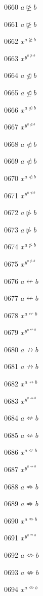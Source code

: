 \documentclass{article}
\begin{document}
0660 $a\ntrianglerighteq b$\par
0661 $\displaystyle a\ntrianglerighteq b$\par
0662 $x^{a\ntrianglerighteq b}$\par
0663 $x^{y^{a\ntrianglerighteq b}}$\par
0664 $a\ntrianglelefteq b$\par
0665 $\displaystyle a\ntrianglelefteq b$\par
0666 $x^{a\ntrianglelefteq b}$\par
0667 $x^{y^{a\ntrianglelefteq b}}$\par
0668 $a\ntriangleleft b$\par
0669 $\displaystyle a\ntriangleleft b$\par
0670 $x^{a\ntriangleleft b}$\par
0671 $x^{y^{a\ntriangleleft b}}$\par
0672 $a\ntriangleright b$\par
0673 $\displaystyle a\ntriangleright b$\par
0674 $x^{a\ntriangleright b}$\par
0675 $x^{y^{a\ntriangleright b}}$\par
0676 $a\nleftarrow b$\par
0677 $\displaystyle a\nleftarrow b$\par
0678 $x^{a\nleftarrow b}$\par
0679 $x^{y^{a\nleftarrow b}}$\par
0680 $a\nrightarrow b$\par
0681 $\displaystyle a\nrightarrow b$\par
0682 $x^{a\nrightarrow b}$\par
0683 $x^{y^{a\nrightarrow b}}$\par
0684 $a\nLeftarrow b$\par
0685 $\displaystyle a\nLeftarrow b$\par
0686 $x^{a\nLeftarrow b}$\par
0687 $x^{y^{a\nLeftarrow b}}$\par
0688 $a\nRightarrow b$\par
0689 $\displaystyle a\nRightarrow b$\par
0690 $x^{a\nRightarrow b}$\par
0691 $x^{y^{a\nRightarrow b}}$\par
0692 $a\nLeftrightarrow b$\par
0693 $\displaystyle a\nLeftrightarrow b$\par
0694 $x^{a\nLeftrightarrow b}$\par
\end{document}
